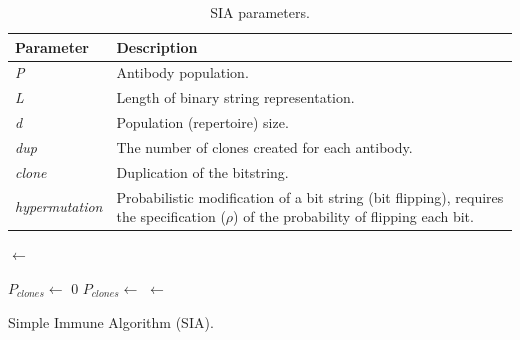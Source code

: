\begin{table}[ht]
	\centering\small
		\begin{tabularx}{\textwidth}{lX}
		\toprule
		\textbf{Parameter} & \textbf{Description} \\ 
		\toprule
		\emph{P} & Antibody population. \\ 
		\midrule
		\emph{L} & Length of binary string representation. \\ 
		\midrule
		\emph{d} & Population (repertoire) size. \\ 
		\midrule
		\emph{dup} & The number of clones created for each antibody. \\ 
		\midrule
		\emph{clone} & Duplication of the bitstring. \\ 
		\midrule
		\emph{hypermutation} & Probabilistic modification of a bit string (bit flipping), requires the specification ($\rho$) of the probability of flipping each bit. \\ 
		\bottomrule
		\end{tabularx}
	\caption{SIA parameters.}
	\label{tab:cs:algorithms:siaparameters}
\end{table}


\begin{algorithm}[ht]
  \SetLine
  
  
  \KwIn{\PopSize, \CloneSize, $\rho$, \Length}		
  \KwOut{\Pop}    
  
  \Pop $\leftarrow$ \CreateRandomCells{\PopSize, \Length}\;
  
	{
		\;		%
	}
	\While{$\neg$\StopCondition{}}
	{
		$P_{clones} \leftarrow$ 0\;
		{
			$P_{clones} \leftarrow$ \;
		}
		{
			\;
			\; %
		}
		\Pop $\leftarrow$ 		%
	}
	\Return{\Pop}\;	
	\caption{Simple Immune Algorithm (SIA).}
	\label{alg:cs:algorithms:sia}
\end{algorithm}

